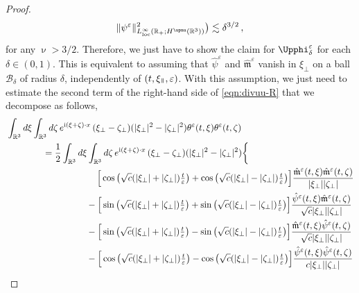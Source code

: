 \documentclass[11pt,reqno]{amsart}
\def \R{{\mathbb{R}}}
\newcommand{\myparallel}{{\mkern3mu\vphantom{\perp}\vrule depth 0pt\mkern2mu\vrule depth 0pt\mkern3mu}}
\begin{document}
\begin{proof}
\begin{align*}
    \|\psi^\varepsilon\|_{L_{\rm loc}^\infty(\R_+;H^\upnu(\R^3))}^2\big) \lesssim  \delta^{3/2}\,,
  \end{align*}
  for any $\upnu > 3/2$. Therefore, we just have to show the claim for $\Upphi_\delta^\varepsilon$ for each $\delta \in (0,1)$. This is equivalent to assuming that  $\hat \psi^\varepsilon$ and   $\hat{\mathfrak  m}^\varepsilon$ vanish in $\xi_\perp$ on a ball $\mathscr{B}_\delta$ of radius $\delta$, independently  of $(t,\xi_\myparallel,\varepsilon)$. With this assumption, we just need to estimate the second term of the right-hand side of  \eqref{eqn:divuu-R} that  we decompose as follows, 
  \begin{align*}
    \label{eqn:tfe1}
    &\int_{\R^3}d\xi \int_{\R^3}d\zeta\, e^{{\rm i}(\xi+\zeta)\cdot x} \, (\xi_\perp - \zeta_\perp)(|\xi_\perp|^2 - |\zeta_\perp|^2)
    \theta^\varepsilon(t,\xi)  \theta^\varepsilon(t,\zeta) \nonumber\\
    & \qquad \qquad  = \frac12\int_{\R^3}d\xi \int_{\R^3}d\zeta\, e^{{\rm i}(\xi+\zeta)\cdot x} \, (\xi_\perp - \zeta_\perp)(|\xi_\perp|^2 - |\zeta_\perp|^2) \bigg \{ \nonumber \\
    & \qquad \qquad \qquad  \qquad  \qquad  \Big [  \cos\big(\sqrt{c}(|\xi_\perp|+|\zeta_\perp|) \tfrac{t}{\varepsilon}\big) +  \cos\big(\sqrt{c}(|\xi_\perp|-|\zeta_\perp|) \tfrac{t}{\varepsilon}\big) \Big] \frac{\hat{\mathfrak  m}^\varepsilon(t,\xi) \hat{\mathfrak  m}^\varepsilon(t,\zeta) }{|\xi_\perp||\zeta_\perp|} \nonumber\\
    & \qquad \qquad \qquad  \qquad  \ \ \,  -\Big [  \sin\big(\sqrt{c}(|\xi_\perp|+|\zeta_\perp|) \tfrac{t}{\varepsilon}\big) +  \sin\big(\sqrt{c}(|\xi_\perp|-|\zeta_\perp|) \tfrac{t}{\varepsilon}\big) \Big]
    \frac{\hat \psi^\varepsilon(t,\xi) \hat{\mathfrak  m}^\varepsilon(t,\zeta) }{\sqrt{c}|\xi_\perp||\zeta_\perp|} \nonumber\\
    & \qquad \qquad \qquad  \qquad  \ \ \,  -\Big [  \sin\big(\sqrt{c}(|\xi_\perp|+|\zeta_\perp|) \tfrac{t}{\varepsilon}\big) -  \sin\big(\sqrt{c}(|\xi_\perp|-|\zeta_\perp|) \tfrac{t}{\varepsilon}\big) \Big]
    \frac{\hat{\mathfrak  m}^\varepsilon(t,\xi) \hat \psi^\varepsilon(t,\zeta) }{\sqrt{c}|\xi_\perp||\zeta_\perp|} \nonumber\\
     & \qquad \qquad \qquad  \qquad  \ \ \,   -\Big [  \cos\big(\sqrt{c}(|\xi_\perp|+|\zeta_\perp|) \tfrac{t}{\varepsilon}\big) -  \cos\big(\sqrt{c}(|\xi_\perp|-|\zeta_\perp|) \tfrac{t}{\varepsilon}\big) \Big]
    \frac{\hat \psi^\varepsilon(t,\xi) \hat \psi^\varepsilon(t,\zeta) }{c|\xi_\perp||\zeta_\perp|}

\end{align*}
\end{proof}
\end{document}
